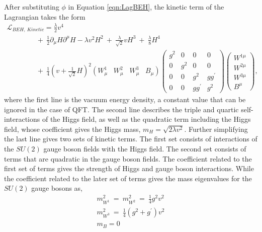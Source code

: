 After substituting $\phi$ in Equation \ref{eqn:LagBEH}, the kinetic term of the Lagrangian takes the form
\begin{equation}
\begin{array}{l}
\mathcal{L}_{BEH,~Kinetic}  = \frac{\lambda}{2}v^{4} \\
\hspace{50pt}  +~\frac{1}{2} \partial_{\mu}H \partial^{\mu}H - \lambda v^{2}H^{2} ~+~ \frac{\lambda}{\sqrt{2}} v H^{3} ~+~ \frac{\lambda}{8} H^4  \\
\hspace{50pt} +~ \frac{1}{4} ( v +\frac{1}{\sqrt{2} } H)^2 (W_{\mu}^{1} \hspace{10pt} W_{\mu}^2 \hspace{10pt} W_{\mu}^3 \hspace{10pt} B_{\mu} ) \begin{pmatrix} g^2 & 0 & 0 & 0 \\ 0 & g^2 & 0 & 0 \\  0  & 0 & g^2 & gg^{'} \\ 0  & 0 & gg^{'} & g^{2} \end{pmatrix} \begin{pmatrix} W^{1\mu}\\ W^{2\mu} \\ W^{3\mu} \\ B^{\mu} \end{pmatrix},
\end{array}
\label{eqn:LagBEHKin}
\end{equation}
where the first line is the vacuum energy density, a constant value that can be ignored in the case of QFT. The second line describes the triple and quartic self-interactions of the Higgs field, as well as the quadratic term including the Higgs field, whose coefficient gives the Higgs mass, $m_{H} = \sqrt{2\lambda v^2}$. Further simplifying the last line gives two sets of kinetic terms. The first set consists of interactions of the $SU(2)$ gauge boson fields with the Higgs field. The second set consists of terms that are quadratic in the gauge boson fields. The coefficient related to the first set of terms gives the strength of Higgs and gauge boson interactions. While the coefficient related to the later set of terms gives the mass eigenvalues for the $SU(2)$ gauge bosons as, 
\begin{equation}
\begin{array}{l}
m_{W^1}^2 ~=~ m_{W^2}^2  ~=~\frac{1}{4}g^2v^2 \\
m_{W^3}^2  ~=~\frac{1}{4}(g^2+g^{'})v^2 \\
m_{B} = 0
\end{array}
\label{eqn:MassesofSU2Bosons}
\end{equation}

